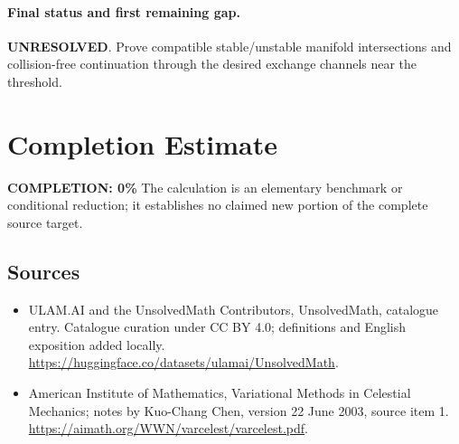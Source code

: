 \documentclass[11pt]{article}
\begin{document}
\paragraph{Final status and first remaining gap.}
\textbf{UNRESOLVED}. Prove compatible stable/unstable manifold intersections and collision-free continuation through the desired exchange channels near the threshold.

\section{Completion Estimate}
\noindent\textbf{COMPLETION: 0\%}
The calculation is an elementary benchmark or conditional reduction; it establishes no claimed new portion of the complete source target.

\subsection{Sources}
\begin{itemize}
\item[\hypertarget{source:statement:1}{S1}] ULAM.AI and the UnsolvedMath Contributors, UnsolvedMath, catalogue entry. Catalogue curation under CC BY 4.0; definitions and English exposition added locally.
\url{https://huggingface.co/datasets/ulamai/UnsolvedMath}.
\item[\hypertarget{source:statement:2}{S2}] American Institute of Mathematics, Variational Methods in Celestial Mechanics; notes by Kuo-Chang Chen, version 22 June 2003, source item 1.
\url{https://aimath.org/WWN/varcelest/varcelest.pdf}.
\end{itemize}
\label{end:statement}
\end{document}
